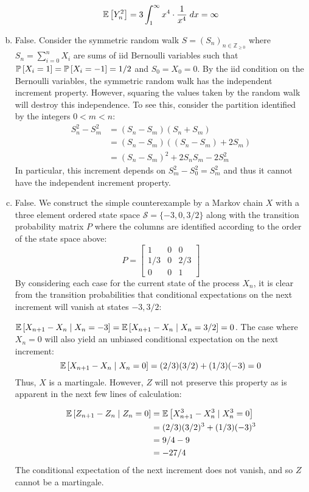 \documentclass[12pt]{article}%
\begin{document}
\begin{enumerate}[a.]
        \[\mathbb{E}\left[Y_{n}^{2}\right] = 3\int_1^{\infty} x^4\cdot \frac{1}{x^{4}} \; dx = \infty \]

  \item
        False. Consider the symmetric random walk $S = (S_{n})_{n \in \mathbb{Z}_{\geq 0}}$ where $S_n = \sum_{i=0}^nX_{i}$ are sums of iid Bernoulli variables such that $\mathbb{P}\left[X_{i} = 1\right] = \mathbb{P}\left[X_{i} = -1\right] = 1/2$ and $S_0 = X_0 = 0$. By the iid condition on the Bernoulli variables, the symmetric random walk has the independent increment property. However, squaring the values taken by the random walk will destroy this independence. To see this, consider the partition identified by the integers $0 < m < n$:
%
        \begin{align*}
          S_n^2-S_{m}^{2} & = (S_n-S_m)(S_n+S_m) \\
                          & = (S_{n}-S_{m})((S_{n} - S_{m}) + 2 S_{m}) \\
          & = (S_n-S_m)^2 + 2S_nS_m - 2S_{m}^{2}
        \end{align*}
        In particular, this increment depends on $S_m^2-S_0^2= S_m^{2}$ and thus it cannot have the independent increment property.

  \item
        False. We construct the simple counterexample by a Markov chain $X$ with a three element ordered state space $\mathcal{S} = \{-3,0,3/2\}$ along with the transition probability matrix $P$ where the columns are identified according to the order of the state space above:
        \[P = \begin{bmatrix}
                1 & 0 & 0 \\
                1/3 & 0 & 2/3 \\
                0 & 0 & 1
              \end{bmatrix}\]
        By considering each case for the current state of the process $X_{n}$, it is clear from the transition probabilities that conditional expectations on the next increment will vanish at states $-3,3/2$:

        $\mathbb{E}\left[{X_{n+1} - X_{n}}\mid {X_{n} = -3}\right] = \mathbb{E}\left[{X_{n+1} - X_{n}}\mid {X_{n} = 3/2}\right] = 0$. The case where $X_n = 0$ will also yield an unbiased conditional expectation on the next increment:
        \[\mathbb{E}\left[{X_{n+1} - X_{n}}\mid {X_{n} = 0}\right] = (2/3)(3/2) + (1/3)(-3) = 0\]
        Thus, $X$ is a martingale. However, $Z$ will not preserve this property as is apparent in the next few lines of calculation:

        \begin{align*}
          \mathbb{E}\left[{Z_{n+1} - Z_{n}}\mid {Z_{n} = 0}\right] & = \mathbb{E}\left[{X_{n+1}^3 - X_n^3}\mid {X^{3}_n = 0}\right] \\
                                               & = (2/3)(3/2)^3 + (1/3)(-3)^{3} \\
                                               & = 9/4 - 9 \\
          & = -27/4
        \end{align*}
        The conditional expectation of the next increment does not vanish, and so $Z$ cannot be a martingale.
\end{enumerate}
\end{document}
